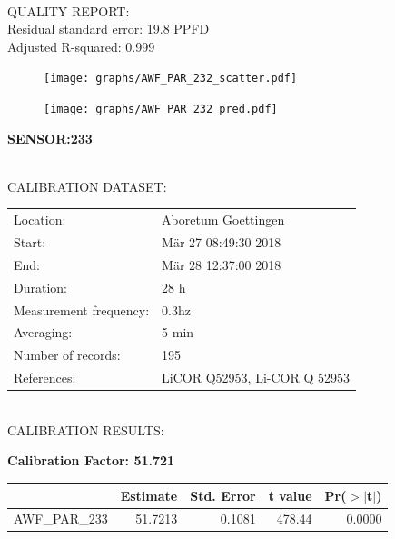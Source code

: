 \documentclass[oneside]{report}
\begin{document}
\hrulefill\\
QUALITY REPORT:\\
Residual standard error: 19.8 PPFD\\
Adjusted R-squared: 0.999



\begin{figure}[H]
  \centering
  \texttt{[image: graphs/AWF\_PAR\_232\_scatter.pdf]}
\end{figure}




\begin{figure}[H]
  \centering
  \texttt{[image: graphs/AWF\_PAR\_232\_pred.pdf]}
\end{figure}

\pagebreak


\begin{center}
\large{\textbf{SENSOR:233}}\\
\end{center}

\hrulefill\\
CALIBRATION DATASET:\\
\begin{table}[h!]
  \centering
  \label{tab:table1}
  \begin{tabular}{ll}
    Location: & Aboretum Goettingen\\ 
    
    
    Start:  & Mär 27 08:49:30 2018 \\
    End:   & Mär 28 12:37:00 2018\\ 
    Duration: & 28 h\\
    Measurement frequency: & 0.3hz\\
    Averaging:  &5 min\\
    Number of records: & 195 \\
    References: & LiCOR Q52953, Li-COR Q 52953 \\
  \end{tabular}
\end{table}

\hrulefill\\
CALIBRATION RESULTS:\\


\begin{center}
\textbf{\large{Calibration Factor: 51.721}}\\
\end{center}
\begin{table}[ht]
\centering
\begin{tabular}{rrrrr}
  \hline
 & Estimate & Std. Error & t value & Pr($>$$|$t$|$) \\ 
  \hline
AWF\_PAR\_233 & 51.7213 & 0.1081 & 478.44 & 0.0000 \\ 
   \hline
\end{tabular}
\end{table}
\end{document}
